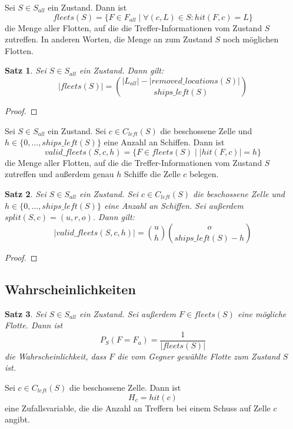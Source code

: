 \documentclass[a4paper,12pt]{llncs}
\numberwithin{equation}{section}
\newtheorem{satz}{Satz}
\begin{document}
\begin{definition}
Sei $S\in S_{all}$ ein Zustand.
Dann ist
\[
fleets(S)=\{F\in F_{all} \mid \forall (c,L) \in S \colon hit(F, c)=L\}
\]
die Menge aller Flotten, auf die die Treffer-Informationen vom Zustand $S$ zutreffen.
In anderen Worten, die Menge an zum Zustand $S$ noch möglichen Flotten.
\end{definition}

\begin{satz}
Sei $S\in S_{all}$ ein Zustand.
Dann gilt:
\[
|fleets(S)|=\binom{|L_{all}| - |removed\_locations(S)|}{ships\_left(S)}
\]

\end{satz}

\begin{proof}
\end{proof}

\begin{definition}
Sei $S\in S_{all}$ ein Zustand.
Sei $c \in C_{left}(S)$ die beschossene Zelle und $h \in \{0, \dots, ships\_left(S)\}$ eine Anzahl an Schiffen.
Dann ist
\[
valid\_fleets(S,c,h)=\{F \in fleets(S) \mid |hit(F, c)|=h\}
\]
die Menge aller Flotten, auf die die Treffer-Informationen vom Zustand $S$ zutreffen und außerdem genau $h$ Schiffe die Zelle $c$ belegen.
\end{definition}

\begin{satz}
Sei $S\in S_{all}$ ein Zustand.
Sei $c \in C_{left}(S)$ die beschossene Zelle und $h \in \{0, \dots, ships\_left(S)\}$ eine Anzahl an Schiffen.
Sei außerdem $split(S,c)=(u, r, o)$.
Dann gilt:
\[
|valid\_fleets(S,c,h)|=\binom{u}{h} \binom{o}{ships\_left(S) - h}
\]
\end{satz}

\begin{proof}
\end{proof}

\subsection{Wahrscheinlichkeiten}

\begin{satz}
Sei $S\in S_{all}$ ein Zustand.
Sei außerdem $F \in fleets(S)$ eine mögliche Flotte.
Dann ist
\[
P_S(F = F_a)=\frac{1}{|fleets(S)|}
\]
die Wahrscheinlichkeit, dass $F$ die vom Gegner gewählte Flotte zum Zustand $S$ ist.
\end{satz}

\begin{definition}
Sei $c \in C_{left}(S)$ die beschossene Zelle.
Dann ist
\[
H_{c}=hit(c)
\]
eine Zufallsvariable, die die Anzahl an Treffern bei einem Schuss auf Zelle $c$ angibt.
\end{definition}
\end{document}
